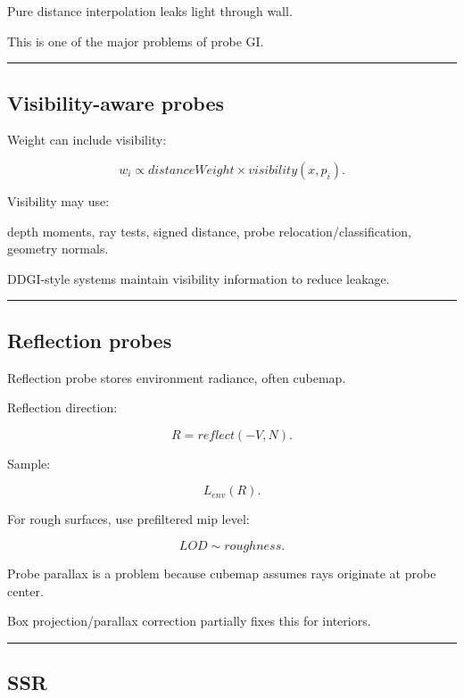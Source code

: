 Pure distance interpolation leaks light through wall.

This is one of the major problems of probe GI.

\begin{center}\rule{0.5\linewidth}{0.5pt}\end{center}

\subsection{Visibility-aware probes}\label{04-visual-computing-ii-ch040-visibility-aware-probes}

Weight can include visibility:

\[
w_i
\propto
distanceWeight
\times
visibility(x,p_i).
\]

Visibility may use:

depth moments, ray tests, signed distance, probe relocation/classification, geometry normals.

DDGI-style systems maintain visibility information to reduce leakage.

\begin{center}\rule{0.5\linewidth}{0.5pt}\end{center}

\subsection{Reflection probes}\label{04-visual-computing-ii-ch040-reflection-probes}

Reflection probe stores environment radiance, often cubemap.

Reflection direction:

\[
R=
reflect(-V,N).
\]

Sample:

\[
L_{env}(R).
\]

For rough surfaces, use prefiltered mip level:

\[
LOD
\sim
roughness.
\]

Probe parallax is a problem because cubemap assumes rays originate at probe center.

Box projection/parallax correction partially fixes this for interiors.

\begin{center}\rule{0.5\linewidth}{0.5pt}\end{center}

\subsection{SSR}\label{04-visual-computing-ii-ch040-ssr}

